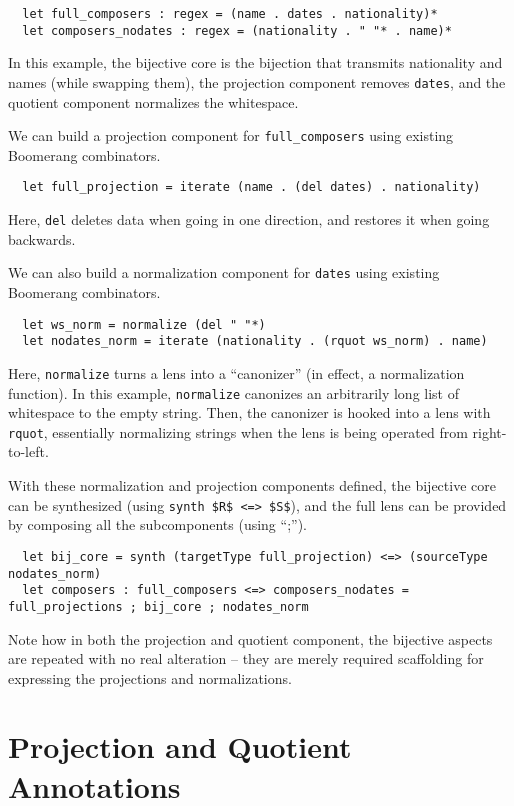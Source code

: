 \documentclass[a4paper]{article}
\begin{document}
\begin{lstlisting}
  let full_composers : regex = (name . dates . nationality)*
  let composers_nodates : regex = (nationality . " "* . name)*
\end{lstlisting}

In this example, the bijective core is the bijection that transmits nationality and
names (while swapping them), the projection component removes \lstinline{dates},
and the quotient component normalizes the whitespace.

We can build a projection component for \lstinline{full_composers} using
existing Boomerang combinators.
%
\begin{lstlisting}
  let full_projection = iterate (name . (del dates) . nationality)
\end{lstlisting}
%
Here, \lstinline{del} deletes data when going in one direction, and restores it
when going backwards.

We can also build a normalization component for \lstinline{dates} using existing
Boomerang combinators.
%
\begin{lstlisting}
  let ws_norm = normalize (del " "*)
  let nodates_norm = iterate (nationality . (rquot ws_norm) . name)
\end{lstlisting}
%
Here, \lstinline{normalize} turns a lens into a ``canonizer'' (in effect, a
normalization function). In this example, \lstinline{normalize} canonizes an
arbitrarily long list of whitespace to the empty string. Then, the canonizer is
hooked into a lens with \lstinline{rquot}, essentially normalizing strings when
the lens is being operated from right-to-left.

With these normalization and projection components defined, the bijective core
can be synthesized (using \lstinline{synth $R$ <=> $S$}), and the full lens can be
provided by composing all the subcomponents (using ``;'').
\begin{lstlisting}
  let bij_core = synth (targetType full_projection) <=> (sourceType nodates_norm)
  let composers : full_composers <=> composers_nodates = full_projections ; bij_core ; nodates_norm
\end{lstlisting}

Note how in both the projection and quotient component, the bijective aspects
are repeated with no real alteration -- they are merely required scaffolding
for expressing the projections and normalizations.

\section{Projection and Quotient Annotations}
\end{document}
